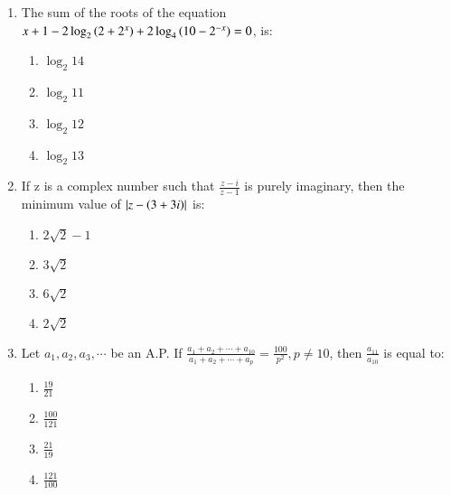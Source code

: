 \documentclass[journal]{IEEEtran}
\begin{document}
\begin{enumerate}
        \begin{multicols}{4}
            \begin{enumerate}
                \item $4\phi\brak{2}$
                \item $4\phi\brak{1}$
                \item $2\phi\brak{1}$
                \item $\phi\brak{1}$
            \end{enumerate}
        \end{multicols}
        
    \item The sum of the roots of the equation $x+1-2\log_2\left(2+2^x\right)+2\log_4\left(10-2^{-x}\right)=0$, is:

        \begin{multicols}{4}
            \begin{enumerate}
                \item $\log_2 14$
                \item $\log_2 11$
                \item $\log_2 12$
                \item $\log_2 13$
            \end{enumerate}
        \end{multicols}

    \item If z is a complex number such that $\frac{z-i}{z-1}$ is purely imaginary, then the minimum value of $\left\vert z-\left(3+3i\right)\right\vert$ is:

        \begin{multicols}{4}
            \begin{enumerate}
                \item $2\sqrt{2}-1$
                \item $3\sqrt{2}$
                \item $6\sqrt{2}$
                \item $2\sqrt{2}$
            \end{enumerate}
        \end{multicols}

    \item Let $a_1,a_2,a_3,\cdots$ be an A.P. If $\frac{a_1+a_2+\cdots+a_{10}}{a_1+a_2+\cdots+a_p}=\frac{100}{p^2},p\neq10$, then $\frac{a_{11}}{a_{10}}$ is equal to:
    
        \begin{multicols}{4}
            \begin{enumerate}
                \item $\frac{19}{21}$
                \item $\frac{100}{121}$
                \item $\frac{21}{19}$
                \item $\frac{121}{100}$
            \end{enumerate}
        \end{multicols}





\end{enumerate}
\end{document}
